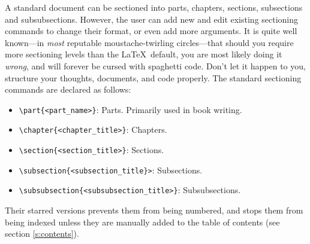 A standard document can be sectioned into parts, chapters, sections,
subsections and subsubsections.  However, the user can add new and
edit existing sectioning commands to change their format, or even add
more arguments.  It is quite well known---in \emph{most} reputable
moustache-twirling circles---that should you require more sectioning
levels than the \LaTeX~default, you are most likely doing it
\emph{wrong}, and will forever be cursed with spaghetti code.  Don't
let it happen to you, structure your thoughts, documents, and code
properly.  The standard sectioning commands are declared as follows:
\begin{itemize}
	\item \verb|\part{<part_name>}|: Parts. Primarily used in book writing.
	\item \verb|\chapter{<chapter_title>}|: Chapters.
	\item \verb|\section{<section_title>}|: Sections.
	\item \verb|\subsection{<subsection_title}>|: Subsections.
	\item \verb|\subsubsection{<subsubsection_title>}|: Subsubsections.
\end{itemize}
%
Their starred versions prevents them from being numbered, and stops
them from being indexed unless they are manually added to the table of
contents (see section \ref{s:contents}).
